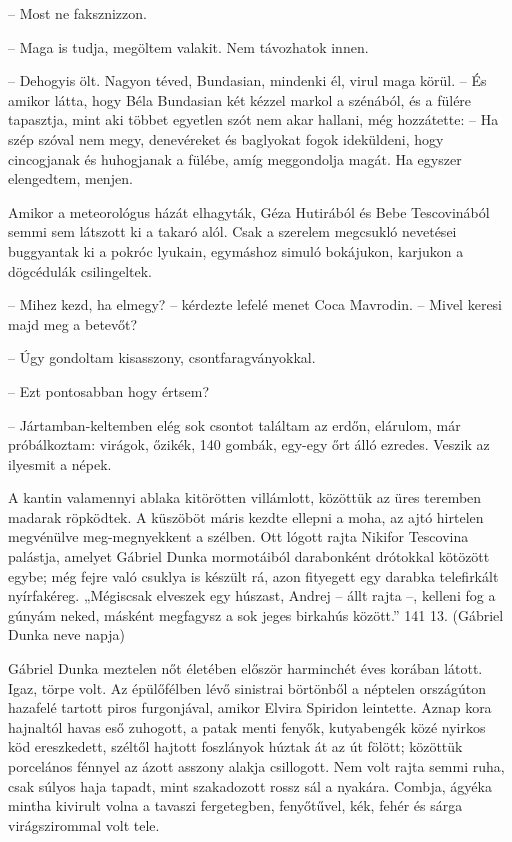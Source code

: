 \documentclass{IEEEtran}
\begin{document}
– Most ne faksznizzon.

– Maga is tudja, megöltem valakit. Nem távozhatok innen.

– Dehogyis ölt. Nagyon téved, Bundasian, mindenki él, virul maga körül. – És
amikor látta, hogy Béla Bundasian két kézzel markol a szénából, és a fülére
tapasztja, mint aki többet egyetlen szót nem akar hallani, még hozzátette: –
Ha szép szóval nem megy, denevéreket és baglyokat fogok ideküldeni, hogy
cincogjanak és huhogjanak a fülébe, amíg meggondolja magát. Ha egyszer
elengedtem, menjen.

Amikor a meteorológus házát elhagyták, Géza Hutirából és Bebe Tescovinából
semmi sem látszott ki a takaró alól. Csak a szerelem megcsukló nevetései
buggyantak ki a pokróc lyukain, egymáshoz simuló bokájukon, karjukon a
dögcédulák csilingeltek.

– Mihez kezd, ha elmegy? – kérdezte lefelé menet Coca Mavrodin. – Mivel keresi
majd meg a betevőt?

– Úgy gondoltam kisasszony, csontfaragványokkal.

– Ezt pontosabban hogy értsem?

– Jártamban-keltemben elég sok csontot találtam az erdőn, elárulom, már
próbálkoztam: virágok, őzikék, 140 gombák, egy-egy őrt álló ezredes. Veszik az
ilyesmit a népek.

A kantin valamennyi ablaka kitörötten villámlott, közöttük az üres teremben
madarak röpködtek. A küszöböt máris kezdte ellepni a moha, az ajtó hirtelen
megvénülve meg-megnyekkent a szélben. Ott lógott rajta Nikifor Tescovina
palástja, amelyet Gábriel Dunka mormotáiból darabonként drótokkal kötözött
egybe; még fejre való csuklya is készült rá, azon fityegett egy darabka
telefirkált nyírfakéreg. „Mégiscsak elveszek egy húszast, Andrej – állt rajta
–, kelleni fog a gúnyám neked, másként megfagysz a sok jeges birkahús között.”
141
13. (Gábriel Dunka neve napja)

Gábriel Dunka meztelen nőt életében először harminchét éves korában látott.
Igaz, törpe volt. Az épülőfélben lévő sinistrai börtönből a néptelen
országúton hazafelé tartott piros furgonjával, amikor Elvira Spiridon
leintette. Aznap kora hajnaltól havas eső zuhogott, a patak menti fenyők,
kutyabengék közé nyirkos köd ereszkedett, széltől hajtott foszlányok húztak át
az út fölött; közöttük porcelános fénnyel az ázott asszony alakja csillogott.
Nem volt rajta semmi ruha, csak súlyos haja tapadt, mint szakadozott rossz sál
a nyakára. Combja, ágyéka mintha kivirult volna a tavaszi fergetegben,
fenyőtűvel, kék, fehér és sárga virágszirommal volt tele.
\end{document}
